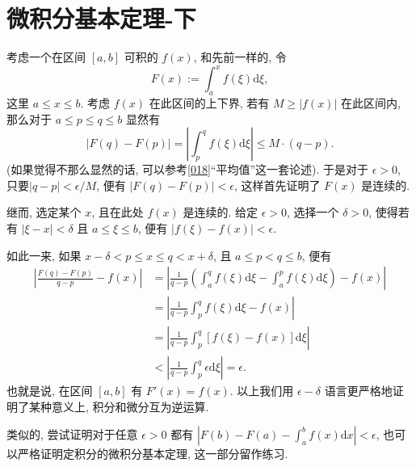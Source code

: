 \section{微积分基本定理-下}\label{019}

\begin{tcolorbox}[size=fbox, breakable, enhanced jigsaw, title={更加严格的版本 - 选读}]

考虑一个在区间 \([a,b]\) 可积的 \(f(x)\), 和先前一样的, 令 \[
F(x):=\int_a^xf(\xi)\mathrm{d}\xi,
\] 这里 \(a\le x \le b\). 考虑 \(f(x)\) 在此区间的上下界, 若有
\(M\ge |f(x)|\) 在此区间内, 那么对于 \(a\le p \le q \le b\) 显然有 \[
|F(q)-F(p)|=\left|\int_p^qf(\xi)\mathrm{d}\xi\right|\le M\cdot(q-p).
\] (如果觉得不那么显然的话, 可以参考\ref{018}``平均值''这一套论述).
于是对于 \(\epsilon>0\), 只要\(|q-p|<\epsilon/M\), 便有
\(|F(q)-F(p)|<\epsilon\), 这样首先证明了 \(F(x)\) 是连续的.

继而, 选定某个 \(x\), 且在此处 \(f(x)\) 是连续的. 给定 \(\epsilon>0\),
选择一个 \(\delta>0\), 使得若有 \(|\xi-x|<\delta\) 且 \(a\le\xi\le b\),
便有 \(|f(\xi)-f(x)|<\epsilon\).

如此一来, 如果 \(x-\delta<p\le x\le q<x+\delta\), 且 \(a\le p<q\le b\),
便有 \[
\begin{aligned}
\left|\frac{F(q)-F(p)}{q-p}-f(x)\right|&=\left|\frac{1}{q-p}\left(\int_a^qf(\xi)\mathrm{d}\xi-\int_a^pf(\xi)\mathrm{d}\xi\right)-f(x)\right|\\
&=\left|\frac{1}{q-p}\int_p^qf(\xi)\mathrm{d}\xi-f(x)\right|\\
&=\left|\frac{1}{q-p}\int_p^q[f(\xi)-f(x)]\mathrm{d}\xi\right|\\
&<\left|\frac{1}{q-p}\int_p^q\epsilon\mathrm{d}\xi\right|=\epsilon.
\end{aligned}
\] 也就是说, 在区间 \([a,b]\) 有 \(F'(x)=f(x)\). 以上我们用
\(\epsilon-\delta\) 语言更严格地证明了某种意义上, 积分和微分互为逆运算.

类似的, 尝试证明对于任意 \(\epsilon>0\) 都有
\(\left|F(b)-F(a)-\int_a^bf(x)\mathrm{d}x\right|<\epsilon\),
也可以严格证明定积分的微积分基本定理, 这一部分留作练习.

\end{tcolorbox}

